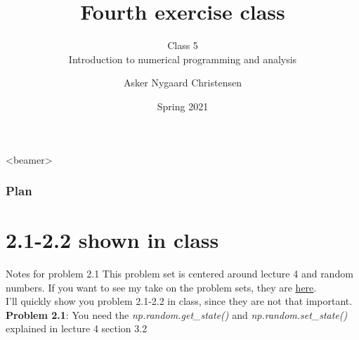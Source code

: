 \documentclass[10pt,danish,t,10pt]{beamer}
\title{Fourth exercise class \vspace{-2mm}}
\subtitle{Class 5 \\Introduction to numerical programming and analysis \vspace{-4mm} }
\author{Asker Nygaard Christensen}
\date{Spring 2021}
\makeatletter
\let\origtableofcontents=\tableofcontents
\def\tableofcontents{\@ifnextchar[{\origtableofcontents}{\gobbletableofcontents}}
\def\gobbletableofcontents#1{\origtableofcontents}
\newcommand{\code}[1]{\textit{#1}} %
\makeatother
\begin{document}
{
\begin{frame}

\maketitle


\end{frame}
}

\addtocounter{framenumber}{-1}

\begin{frame}<beamer>
\frametitle{Plan}
    \tableofcontents[]
\end{frame}



\section{2.1-2.2 shown in class}
\begin{frame}{Notes for problem 2.1}
    This problem set is centered around lecture 4 and random numbers. \newline If you want to see my take on the problem sets, they are
    \href{https://github.com/AskerNC/exercises-2021}{\underline{here}}. \\
    I'll quickly show you problem 2.1-2.2 in class, since they are not that important. \\
    \vspace{1cm}
    \textbf{Problem 2.1}: \newline 
    You need the \code{np.random.get\_state()} and \code{np.random.set\_state()} explained in lecture 4 section 3.2
\end{frame}
\end{document}
